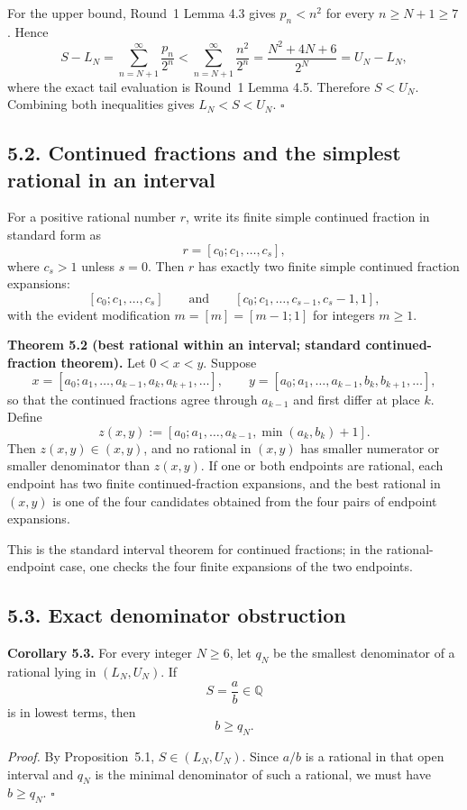 For the upper bound, Round~1 Lemma 4.3 gives $p_n<n^2$ for every $n\ge N+1\ge 7$. Hence
\[
S-L_N
=\sum_{n=N+1}^{\infty}\frac{p_n}{2^n}
<\sum_{n=N+1}^{\infty}\frac{n^2}{2^n}
=\frac{N^2+4N+6}{2^N}
=U_N-L_N,
\]
where the exact tail evaluation is Round~1 Lemma 4.5. Therefore $S<U_N$. Combining both inequalities gives $L_N<S<U_N$. \hfill$\square$

\subsection*{5.2. Continued fractions and the simplest rational in an interval}

For a positive rational number $r$, write its finite simple continued fraction in standard form as
\[
r=[c_0;c_1,\dots,c_s],
\]
where $c_s>1$ unless $s=0$. Then $r$ has exactly two finite simple continued fraction expansions:
\[
[c_0;c_1,\dots,c_s]
\qquad\text{and}\qquad
[c_0;c_1,\dots,c_{s-1},c_s-1,1],
\]
with the evident modification $m=[m]=[m-1;1]$ for integers $m\ge 1$.

\medskip
\noindent\textbf{Theorem 5.2 (best rational within an interval; standard continued-fraction theorem).}
Let $0<x<y$. Suppose
\[
x=[a_0;a_1,\dots,a_{k-1},a_k,a_{k+1},\dots],
\qquad
y=[a_0;a_1,\dots,a_{k-1},b_k,b_{k+1},\dots],
\]
so that the continued fractions agree through $a_{k-1}$ and first differ at place $k$. Define
\[
z(x,y):=[a_0;a_1,\dots,a_{k-1},\min(a_k,b_k)+1].
\]
Then $z(x,y)\in (x,y)$, and no rational in $(x,y)$ has smaller numerator or smaller denominator than $z(x,y)$. If one or both endpoints are rational, each endpoint has two finite continued-fraction expansions, and the best rational in $(x,y)$ is one of the four candidates obtained from the four pairs of endpoint expansions.

\medskip
This is the standard interval theorem for continued fractions; in the rational-endpoint case, one checks the four finite expansions of the two endpoints.

\subsection*{5.3. Exact denominator obstruction}

\medskip
\noindent\textbf{Corollary 5.3.}
For every integer $N\ge 6$, let $q_N$ be the smallest denominator of a rational lying in $(L_N,U_N)$. If
\[
S=\frac ab\in\mathbb Q
\]
is in lowest terms, then
\[
b\ge q_N.
\]

\emph{Proof.}
By Proposition~5.1, $S\in (L_N,U_N)$. Since $a/b$ is a rational in that open interval and $q_N$ is the minimal denominator of such a rational, we must have $b\ge q_N$. \hfill$\square$

